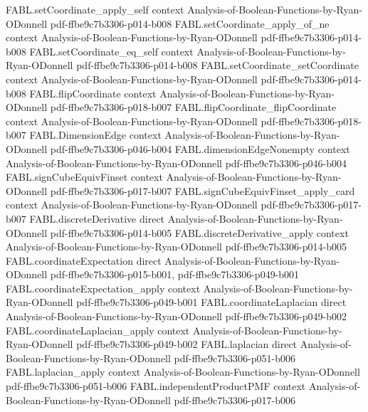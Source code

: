 \begin{theorem}
\proofstep
  {FABL.setCoordinate_apply_self}
  {context}
  {Analysis-of-Boolean-Functions-by-Ryan-ODonnell}
  {pdf-ffbe9c7b3306-p014-b008}
\proofstep
  {FABL.setCoordinate_apply_of_ne}
  {context}
  {Analysis-of-Boolean-Functions-by-Ryan-ODonnell}
  {pdf-ffbe9c7b3306-p014-b008}
\proofstep
  {FABL.setCoordinate_eq_self}
  {context}
  {Analysis-of-Boolean-Functions-by-Ryan-ODonnell}
  {pdf-ffbe9c7b3306-p014-b008}
\proofstep
  {FABL.setCoordinate_setCoordinate}
  {context}
  {Analysis-of-Boolean-Functions-by-Ryan-ODonnell}
  {pdf-ffbe9c7b3306-p014-b008}
\proofstep
  {FABL.flipCoordinate}
  {context}
  {Analysis-of-Boolean-Functions-by-Ryan-ODonnell}
  {pdf-ffbe9c7b3306-p018-b007}
\proofstep
  {FABL.flipCoordinate_flipCoordinate}
  {context}
  {Analysis-of-Boolean-Functions-by-Ryan-ODonnell}
  {pdf-ffbe9c7b3306-p018-b007}
\proofstep
  {FABL.DimensionEdge}
  {context}
  {Analysis-of-Boolean-Functions-by-Ryan-ODonnell}
  {pdf-ffbe9c7b3306-p046-b004}
\proofstep
  {FABL.dimensionEdgeNonempty}
  {context}
  {Analysis-of-Boolean-Functions-by-Ryan-ODonnell}
  {pdf-ffbe9c7b3306-p046-b004}
\proofstep
  {FABL.signCubeEquivFinset}
  {context}
  {Analysis-of-Boolean-Functions-by-Ryan-ODonnell}
  {pdf-ffbe9c7b3306-p017-b007}
\proofstep
  {FABL.signCubeEquivFinset_apply_card}
  {context}
  {Analysis-of-Boolean-Functions-by-Ryan-ODonnell}
  {pdf-ffbe9c7b3306-p017-b007}
\proofstep
  {FABL.discreteDerivative}
  {direct}
  {Analysis-of-Boolean-Functions-by-Ryan-ODonnell}
  {pdf-ffbe9c7b3306-p014-b005}
\proofstep
  {FABL.discreteDerivative_apply}
  {context}
  {Analysis-of-Boolean-Functions-by-Ryan-ODonnell}
  {pdf-ffbe9c7b3306-p014-b005}
\proofstep
  {FABL.coordinateExpectation}
  {direct}
  {Analysis-of-Boolean-Functions-by-Ryan-ODonnell}
  {pdf-ffbe9c7b3306-p015-b001,
    pdf-ffbe9c7b3306-p049-b001}
\proofstep
  {FABL.coordinateExpectation_apply}
  {context}
  {Analysis-of-Boolean-Functions-by-Ryan-ODonnell}
  {pdf-ffbe9c7b3306-p049-b001}
\proofstep
  {FABL.coordinateLaplacian}
  {direct}
  {Analysis-of-Boolean-Functions-by-Ryan-ODonnell}
  {pdf-ffbe9c7b3306-p049-b002}
\proofstep
  {FABL.coordinateLaplacian_apply}
  {context}
  {Analysis-of-Boolean-Functions-by-Ryan-ODonnell}
  {pdf-ffbe9c7b3306-p049-b002}
\proofstep
  {FABL.laplacian}
  {direct}
  {Analysis-of-Boolean-Functions-by-Ryan-ODonnell}
  {pdf-ffbe9c7b3306-p051-b006}
\proofstep
  {FABL.laplacian_apply}
  {context}
  {Analysis-of-Boolean-Functions-by-Ryan-ODonnell}
  {pdf-ffbe9c7b3306-p051-b006}
\proofstep
  {FABL.independentProductPMF}
  {context}
  {Analysis-of-Boolean-Functions-by-Ryan-ODonnell}
  {pdf-ffbe9c7b3306-p017-b006}

\end{theorem}
